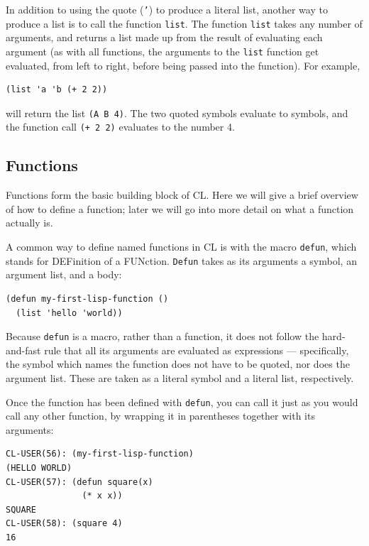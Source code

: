 In addition to using the quote (\texttt{'}) to produce a literal list, another way to produce a
list is to call the function \texttt{list}. The function \texttt{list} takes any number of arguments, and
returns a list made up from the result of evaluating each argument (as with all functions,
the arguments to the \texttt{list} function get evaluated, from left to right, before being passed
into the function). For example,

\begin{verbatim}
(list 'a 'b (+ 2 2))
\end{verbatim}

will return the list \texttt{(A B 4)}. The two quoted symbols evaluate to symbols, and the function
call \texttt{(+ 2 2)} evaluates to the number 4.

\subsection{Functions}

Functions form the basic building block of CL. Here we will give a brief overview of how to
define a function; later we will go into more detail on what a function actually is.

A common way to define named functions in CL is with the macro \texttt{defun}, which stands
for DEFinition of a FUNction. \texttt{Defun} takes as its arguments a symbol, an argument list,
and a body:

\begin{verbatim}
(defun my-first-lisp-function ()
  (list 'hello 'world))
\end{verbatim}

Because \texttt{defun} is a macro, rather than a function, it does not follow the hard-and-fast rule
that all its arguments are evaluated as expressions --- specifically, the symbol which names
the function does not have to be quoted, nor does the argument list. These are taken as a
literal symbol and a literal list, respectively.

Once the function has been defined with \texttt{defun}, you can call it just as you would call
any other function, by wrapping it in parentheses together with its arguments:

\begin{verbatim}
CL-USER(56): (my-first-lisp-function)
(HELLO WORLD)
CL-USER(57): (defun square(x)
               (* x x))
SQUARE
CL-USER(58): (square 4)
16
\end{verbatim}

